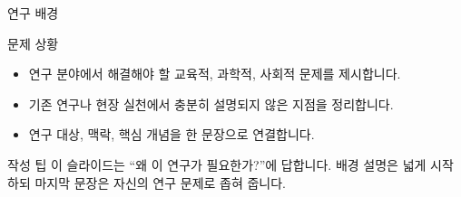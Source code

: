 \begin{frame}[t]{연구 배경}

\small

\begin{block}{문제 상황}

\begin{itemize}

\tightitems

\item 연구 분야에서 해결해야 할 교육적, 과학적, 사회적 문제를 제시합니다.
\item 기존 연구나 현장 실천에서 충분히 설명되지 않은 지점을 정리합니다.
\item 연구 대상, 맥락, 핵심 개념을 한 문장으로 연결합니다.
\end{itemize}
\end{block}

\begin{exampleblock}{작성 팁}
이 슬라이드는 ``왜 이 연구가 필요한가?''에 답합니다. 배경 설명은 넓게 시작하되 마지막 문장은 자신의 연구 문제로 좁혀 줍니다.
\end{exampleblock}

\end{frame}

